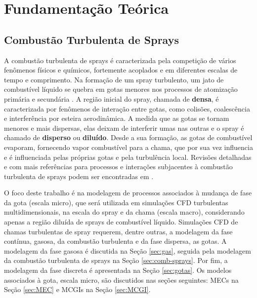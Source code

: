 \section{Fundamentação Teórica}


\subsection{Combustão Turbulenta de Sprays} \label{sec:teoria}

A combustão turbulenta de sprays é caracterizada pela competição de vários fenômenos físicos e químicos, fortemente acoplados e em diferentes escalas de tempo e comprimento. 
Na formação de um spray turbulento, um jato de combustível líquido se quebra em gotas menores nos processos de atomização primária e secundária \cite{JennyB2012}.
A região inicial do spray, chamada de \textbf{densa}, é caracterizada por fenômenos de interação entre gotas, como colisões, coalescência e interferência por esteira aerodinâmica.
A medida que as gotas se tornam menores e mais dispersas, elas deixam de interferir umas nas outras e o spray é chamado de \textbf{disperso} ou \textbf{diluído}. 
Desde a sua formação, as gotas de combustível evaporam, fornecendo vapor combustível para a chama, que por sua vez influencia e é influenciada pelas próprias gotas e pela turbulência local.
Revisões detalhadas e com mais referências para processos e interações subjacentes à combustão turbulenta de sprays podem ser encontradas em \cite{JennyB2012, MasriA2016, SanchezA2015, ZhouL2021,JiangX2010}.

O foco deste trabalho é na modelagem de processos associados à mudança de fase da gota (escala micro), que será utilizada em simulações CFD turbulentas multidimensionais, na escala do spray e da chama (escala macro), considerando apenas a região diluída de sprays de combustível líquido.
Simulações CFD  de chamas turbulentas de spray requerem, dentre outras, a modelagem da fase contínua, gasosa, da combustão turbulenta e da fase dispersa, as gotas.
A modelagem da fase gasosa é discutida na Seção \ref{sec:gas}, seguida pela modelagem da combustão turbulenta de sprays na Seção \ref{sec:comb-sprays}. 
Por fim, a modelagem da fase discreta é apresentada na Seção \ref{sec:gotas}.
Os modelos associados à gota, escala micro, são discutidos nas seções seguintes: MECs na Seção	\ref{sec:MEC} e MCGIs na Seção \ref{sec:MCGI}.


